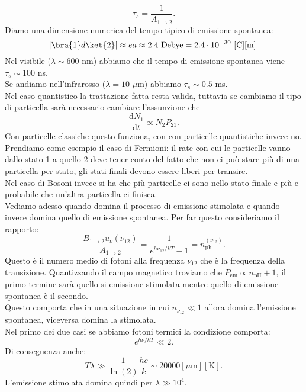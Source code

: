 \[
\tau_{s}=\frac{1}{A_{1\to 2}}
.\] 
Diamo una dimensione numerica del tempo tipico di emissione spontanea:
\[
    \left|\bra{1}d\ket{2}\right|\approx ea \approx 2.4 \text{ Debye} = 2.4\cdot 10^{-30}\text{ [C][m]}
.\] 
Nel visibile ($\lambda\sim 600$ nm) abbiamo che il tempo di emissione spontanea viene $\tau_s \sim 100$  ns.\\
Se andiamo nell'infrarosso ($\lambda  = 10$ $\mu$m) abbiamo $\tau_s\sim 0.5$  ms.\\
Nel caso quantistico la trattazione fatta resta valida, tuttavia se cambiamo il tipo di particella sarà necessario cambiare l'assunzione che 
\[
\frac{\text{d} N_1}{\text{d} t} \propto N_{2}P_{21}
.\]   
Con particelle classiche questo funziona, con con particelle quantistiche invece no. \\
Prendiamo come esempio il caso di Fermioni: il rate con cui le particelle vanno dallo stato 1 a quello 2 deve tener conto del fatto che non ci può stare più di una particella per stato, gli stati finali devono essere liberi per transire.\\
Nel caso di Bosoni invece si ha che più particelle ci sono nello stato finale e più e probabile che un'altra particella ci finisca.\\
Vediamo adesso quando domina il processo di emissione stimolata e quando invece domina quello di emissione spontanea. Per far questo consideriamo il rapporto:
\[
    \frac{B_{1\to 2}u_\nu(\nu_{12})}{A_{1\to 2}} = \frac{1}{e^{h\nu_{12} /kT}-1}
    = n_\text{ph}^{(\nu_{12})}
.\] 
Questo è il numero medio di fotoni alla frequenza $\nu_{12}$  che è la frequenza della transizione. Quantizzando il campo magnetico troviamo che $P_\text{em} \propto n_\text{pH} + 1$, il primo termine sarà quello si emissione stimolata mentre quello di emissione spontanea è il secondo.\\
Questo comporta che in una situazione in cui $n_{\nu_{12}}\ll 1$ allora domina l'emissione spontanea, viceversa domina la stimolata.\\
Nel primo dei due casi se abbiamo fotoni termici la condizione comporta:
\[
e^{h\nu /kT}\ll 2
.\] 
Di conseguenza anche:
\[
    T\lambda\gg \frac{1}{\ln(2)}\frac{hc}{k}\sim 20000 [\mu\text{m}][\text{K}]
.\] 
L'emissione stimolata domina quindi per $\lambda\gg 10^4$.\\
